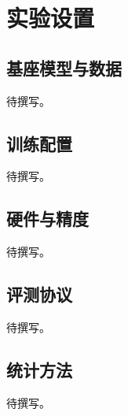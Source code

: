 \section{实验设置}

\subsection{基座模型与数据}

待撰写。

\subsection{训练配置}

待撰写。

\subsection{硬件与精度}

待撰写。

\subsection{评测协议}

待撰写。

\subsection{统计方法}

待撰写。
